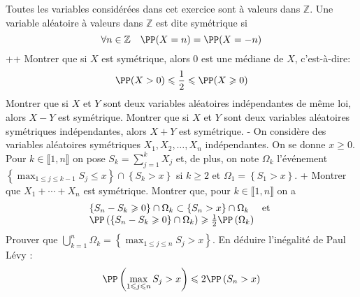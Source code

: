 \begin{exercise} 
Toutes les variables considérées dans cet exercice sont à valeurs dans $\mathbb{Z}$. Une variable aléatoire à valeurs dans $\mathbb{Z}$ est dite symétrique si
\begin{equation*}
\forall n \in \mathbb{Z} \quad \PP(X=n)=\PP(X=-n)
\end{equation*}
\question+\question+ Montrer que si $X$ est symétrique, alors 0 est une médiane de $X$, c'est-à-dire:
\begin{equation*}
\PP(X>0) \leqslant \frac{1}{2} \leqslant \PP(X \geqslant 0)
\end{equation*}
\question Montrer que si $X$ et $Y$ sont deux variables aléatoires indépendantes de même loi, alors $X-Y$ est symétrique.
\question Montrer que si $X$ et $Y$ sont deux variables aléatoires symétriques indépendantes, alors $X+Y$ est symétrique.
\question- On considère des variables aléatoires symétriques $X_{1}, X_{2}, \ldots, X_{n}$ indépendantes. On se donne $x \geqslant 0$. Pour $k \in \llbracket 1, n \rrbracket$ on pose $S_{k}=\sum_{j=1}^{k} X_{j}$ et, de plus, on note $\Omega_{k}$ l'événement $\left\{\max _{1 \leqslant j \leqslant k-1} S_{j} \leqslant x\right\} \cap\left\{S_{k}>x\right\}$ si $k \geqslant 2$ et $\Omega_{1}=\left\{S_{1}>x\right\}$.
\question+ Montrer que $X_{1}+\cdots+X_{n}$ est symétrique.
\question Montrer que, pour $k \in \llbracket 1, n \rrbracket$ on a
\begin{equation*}
\begin{array}{l}
\left\{S_{n}-S_{k} \geqslant 0\right\} \cap \Omega_{k} \subset\left\{S_{n}>x\right\} \cap \Omega_{k} \quad \text { et } \\
\PP\left(\left\{S_{n}-S_{k} \geqslant 0\right\} \cap \Omega_{k}\right) \geqslant \frac{1}{2} \PP\left(\Omega_{k}\right)
\end{array}
\end{equation*}
\question Prouver que $\bigcup_{k=1}^{n} \Omega_{k}=\left\{\max _{1 \leqslant j \leqslant n} S_{j}>x\right\}$.
\question En déduire l'inégalité de Paul Lévy :
\begin{equation*}
\PP\left(\max _{1 \leqslant j \leqslant n} S_{j}>x\right) \leqslant 2 \PP\left(S_{n}>x\right)
\end{equation*}
\endquestions 
\end{exercise}


